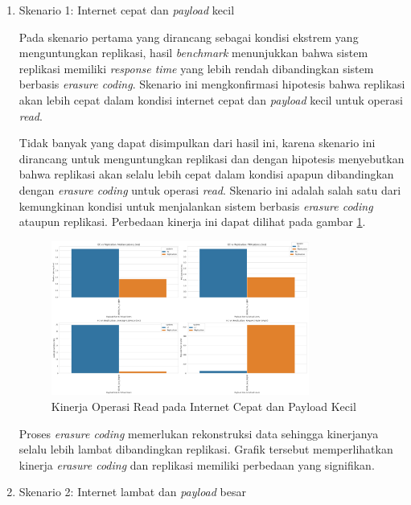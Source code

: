 \begin{enumerate}
  \item Skenario 1: Internet cepat dan \textit{payload} kecil
  
  Pada skenario pertama yang dirancang sebagai kondisi ekstrem yang menguntungkan replikasi, hasil \textit{benchmark} menunjukkan bahwa sistem replikasi memiliki \textit{response time} yang lebih rendah dibandingkan sistem berbasis \textit{erasure coding}. Skenario ini mengkonfirmasi hipotesis bahwa replikasi akan lebih cepat dalam kondisi internet cepat dan \textit{payload} kecil untuk operasi \textit{read}.
  
  Tidak banyak yang dapat disimpulkan dari hasil ini, karena skenario ini dirancang untuk menguntungkan replikasi dan dengan hipotesis menyebutkan bahwa replikasi akan selalu lebih cepat dalam kondisi apapun dibandingkan dengan \textit{erasure coding} untuk operasi \textit{read}. Skenario ini adalah salah satu dari kemungkinan kondisi untuk menjalankan sistem berbasis \textit{erasure coding} ataupun replikasi. Perbedaan kinerja ini dapat dilihat pada gambar \ref{fig:read-smload-fastnet}.

  \begin{figure}[ht]
    \centering
    \includegraphics[width=0.8\textwidth]{resources/chapter-4/read_smload_fastnet.png}

    \caption{Kinerja Operasi Read pada Internet Cepat dan Payload Kecil}
      \label{fig:read-smload-fastnet}
  \end{figure}

  Proses \textit{erasure coding} memerlukan rekonstruksi data sehingga kinerjanya selalu lebih lambat dibandingkan replikasi. Grafik tersebut memperlihatkan kinerja \textit{erasure coding} dan replikasi memiliki perbedaan yang signifikan.

  \item Skenario 2: Internet lambat dan \textit{payload} besar
  

\end{enumerate}
